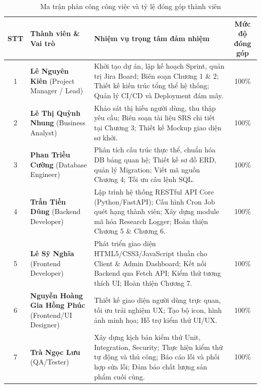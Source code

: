 \begin{table}[htbp]
\centering
\caption{Ma trận phân công công việc và tỷ lệ đóng góp thành viên}
\label{tab:contribution_matrix}
\small
\begin{tabular}{|c|p{3.2cm}|p{6.8cm}|c|}
\hline
\textbf{STT} & \textbf{Thành viên \& Vai trò} & \textbf{Nhiệm vụ trọng tâm đảm nhiệm} & \textbf{Mức độ đóng góp} \\
\hline
1 & \textbf{Lê Nguyên Kiên} \newline (Project Manager / Lead) & Khởi tạo dự án, lập kế hoạch Sprint, quản trị Jira Board; Biên soạn Chương 1 \& 2; Thiết kế kiến trúc tổng thể hệ thống; Quản lý CI/CD và Deployment đám mây. & 100\% \\
\hline
2 & \textbf{Lê Thị Quỳnh Nhung} \newline (Business Analyst) & Khảo sát thị hiếu người dùng, thu thập yêu cầu; Biên soạn tài liệu SRS chi tiết tại Chương 3; Thiết kế Mockup giao diện sơ khởi. & 100\% \\
\hline
3 & \textbf{Phan Triều Cường} \newline (Database Engineer) & Phân tích cấu trúc thực thể, chuẩn hóa DB bảng quan hệ; Thiết kế sơ đồ ERD, quản lý Migration; Viết mã nguồn Chương 4; Tối ưu câu lệnh SQL. & 100\% \\
\hline
4 & \textbf{Trần Tiến Dũng} \newline (Backend Developer) & Lập trình hệ thống RESTful API Core (Python/FastAPI); Cấu hình Cron Job quét hạng thành viên; Xây dựng module mã hóa Research Logger; Hoàn thiện Chương 5 \& Chương 6. & 100\% \\
\hline
5 & \textbf{Lê Sỹ Nghĩa} \newline (Frontend Developer) & Phát triển giao diện HTML5/CSS3/JavaScript thuần cho Client \& Admin Dashboard; Kết nối Backend qua Fetch API; Kiểm thử tương thích UI; Hoàn thiện Chương 7. & 100\% \\
\hline
6 & \textbf{Nguyễn Hoàng Gia Hồng Phúc} \newline (Frontend/UI Designer) & Thiết kế giao diện người dùng trực quan, tối ưu trải nghiệm UX; Tạo bộ icon, hình ảnh minh họa; Hỗ trợ kiểm thử UI/UX. & 100\% \\
\hline
7 & \textbf{Trà Ngọc Lưu} \newline (QA/Tester) & Xây dựng kịch bản kiểm thử Unit, Integration, Security; Thực hiện kiểm thử tự động và thủ công; Báo cáo lỗi và phối hợp sửa lỗi; Đảm bảo chất lượng sản phẩm cuối cùng. & 100\% \\
\hline
\end{tabular}
\end{table}

\newpage

\tableofcontents 

\newpage
\listoffigures   

\newpage
\listoftables    

\newpage